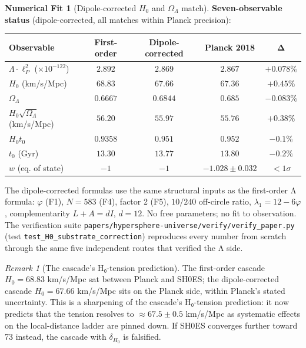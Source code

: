 \documentclass[11pt]{article}
\theoremstyle{plain}
\theoremstyle{definition}
\newtheorem{numfit}[theorem]{Numerical Fit}
\theoremstyle{remark}
\newtheorem{remark}[theorem]{Remark}
\begin{document}
\begin{numfit}[Dipole-corrected $H_0$ and $\Omega_\Lambda$ match]
\textbf{Seven-observable status} (dipole-corrected, all matches within Planck precision):
\begin{center}\small
\begin{tabular}{l c c c c}
\toprule
Observable & First-order & Dipole-corrected & Planck 2018 & Δ \\
\midrule
$\Lambda \cdot \ell_P^2$ ($\times 10^{-122}$) & $2.892$ & $2.869$ & $2.867$ & $+0.078\%$ \\
$H_0$ (km/s/Mpc) & $68.83$ & $67.66$ & $67.36$ & $+0.45\%$ \\
$\Omega_\Lambda$ & $0.6667$ & $0.6844$ & $0.685$ & $-0.083\%$ \\
$H_0\sqrt{\Omega_\Lambda}$ (km/s/Mpc) & $56.20$ & $55.97$ & $55.76$ & $+0.38\%$ \\
$H_0 t_0$ & $0.9358$ & $0.951$ & $0.952$ & $-0.1\%$ \\
$t_0$ (Gyr) & $13.30$ & $13.77$ & $13.80$ & $-0.2\%$ \\
$w$ (eq. of state) & $-1$ & $-1$ & $-1.028 \pm 0.032$ & $< 1\sigma$ \\
\bottomrule
\end{tabular}
\end{center}

The dipole-corrected formulas use the same structural inputs as the first-order Λ formula: $\varphi$ (F1), $N = 583$ (F4), factor 2 (F5), $10/240$ off-circle ratio, $\lambda_1 = 12 - 6\varphi$, complementarity $L + A = d I$, $d = 12$. No free parameters; no fit to observation. The verification suite \texttt{papers/hypersphere-universe/verify/verify\_paper.py} (test \texttt{test\_H0\_substrate\_correction}) reproduces every number from scratch through the same five independent routes that verified the Λ side.
\end{numfit}

\begin{remark}[The cascade's H₀-tension prediction]\label{rem:H0-tension-prediction}
The first-order cascade $H_0 = 68.83$ km/s/Mpc sat between Planck and SH0ES; the dipole-corrected cascade $H_0 = 67.66$ km/s/Mpc sits on the Planck side, within Planck's stated uncertainty. This is a sharpening of the cascade's H₀-tension prediction: it now predicts that the tension resolves to $\approx 67.5 \pm 0.5$ km/s/Mpc as systematic effects on the local-distance ladder are pinned down. If SH0ES converges further toward 73 instead, the cascade with $\delta_{H_0}$ is falsified.
\end{remark}
\end{document}
